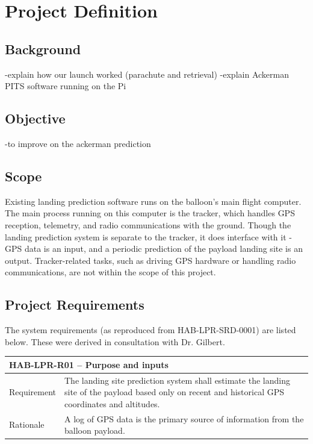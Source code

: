 \documentclass[11pt]{article}
\begin{document}
\section{Project Definition}

\subsection{Background}

-explain how our launch worked (parachute and retrieval)
-explain Ackerman PITS software running on the Pi

\subsection{Objective}
-to improve on the ackerman prediction

\subsection{Scope}

Existing landing prediction software runs on the balloon's main flight computer. The main process running on this computer is the tracker, which handles GPS reception, telemetry, and radio communications with the ground. Though the landing prediction system is separate to the tracker, it does interface with it - GPS data is an input, and a periodic prediction of the payload landing site is an output. Tracker-related tasks, such as driving GPS hardware or handling radio communications, are not within the scope of this project.



\subsection{Project Requirements}

The system requirements (as reproduced from HAB-LPR-SRD-0001) are listed below. These were derived in consultation with Dr. Gilbert.

\FloatBarrier

\begin{table}[!htbp] \centering
 \begin{tabular}{|p{2cm} p{11cm}|}
 \hline
  \multicolumn{2}{|l|}{HAB-LPR-R01 – Purpose and inputs} \\
  \hline
  Requirement & The landing site prediction system shall estimate the landing site of the payload based only on recent and historical GPS coordinates and altitudes. \\
  \hline
  Rationale & A log of GPS data is the primary source of information from the balloon payload.  \\
  \hline
 \end{tabular}
\end{table}
\end{document}
